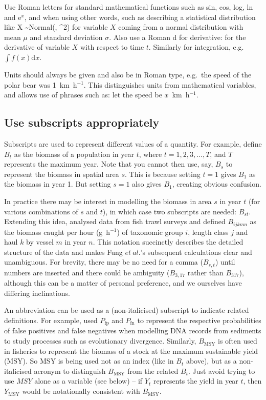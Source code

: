 Use Roman letters for standard mathematical functions such as sin, cos, log, ln
and e$^x$, and
when using other words, such as describing a statistical distribution like
\eb
X \sim \mbox{Normal}(\mu, \sigma^2)
\label{Xnormal}
\ee
for variable $X$ coming from a normal distribution with mean $\mu$ and
standard deviation $\sigma$.
Also use a Roman d for derivative:
\eb
{}
\ee
for the derivative of variable $X$ with respect to time $t$. Similarly for
integration, e.g.~$\int f(x) \mbox{d}x$.

Units should always be given and also be in Roman type, e.g.~the speed of the polar bear was
1~km~h$^{-1}$. This distinguishes units from mathematical variables, and allows
use of phrases such
as: let the speed be $x$~km~h$^{-1}$.



\subsection*{Use subscripts appropriately}

Subscripts are used to represent different values of a quantity.
For example, define $B_t$ as the biomass of a population in year $t$, where
$t=1, 2, 3, ..., T$, and $T$ represents the maximum year.
Note that you cannot then
use, say, $B_s$ to represent the biomass in spatial area $s$. This is
because setting $t=1$ gives $B_1$ as the biomass in year 1. But
setting $s=1$ also gives $B_1$, creating obvious confusion.

In practice there may be interest in modelling the biomass in
area $s$ in year $t$ (for various combinations of $s$ and $t$),
in which case two subscripts are needed: $B_{st}$.
Extending this idea, \citet{ffrr12} analysed data from fish trawl surveys
and defined
$B_{ijkmn}$ as the biomass caught per hour (g~h$^{-1}$) of
taxonomic group $i$,
length class $j$
and haul $k$ by
vessel $m$ in
year $n$. This notation succinctly describes the detailed structure of the data
and makes Fung $et~al.$'s subsequent calculations clear and unambiguous.
For brevity, there may be no need for a comma ($B_{s,t}$) until numbers are
inserted and there
could be ambiguity ($B_{3,17}$ rather than $B_{317}$),
although this can be a matter of personal preference, and we ourselves have
differing inclinations.

An abbreviation can be used as a (non-italicised) subscript to indicate related
definitions.
For example, \citet{olajos18} used $P_\mathrm{fp}$ and $P_\mathrm{fn}$ to
represent the respective probabilities of false positives and false negatives
when modelling DNA records from sediments to study processes such as
evolutionary divergence.
Similarly, $B_\mathrm{MSY}$ is often
used in fisheries to represent the biomass of a stock at the maximum sustainable
yield (MSY). So MSY is being used not as an index (like in $B_t$ above), but as
a non-italicised acronym to
distinguish $B_\mathrm{MSY}$ from the related $B_t$.
Just avoid trying to use $MSY$ alone as
a variable (see below) -- if $Y_t$ represents the yield in
year $t$, then
$Y_\mathrm{MSY}$  would be notationally consistent with
$B_\mathrm{MSY}$.


